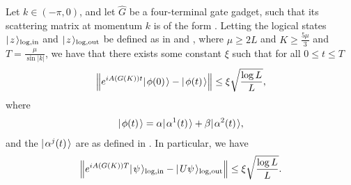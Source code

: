 \documentclass[../thesis-main/thesis-main]{subfiles}
\begin{document}

\begin{lemma}
\label{lem:single_qubit_encoded_computation}
  Let $k\in (-\pi,0)$, and let $\widehat{G}$ be a four-terminal gate gadget, such that its scattering matrix at momentum $k$ is of the form .  Letting the logical states $|\mspace{2mu} z \mspace{2mu} \rangle_{\text{log},\text{in}}$ and $|\mspace{2mu} z \mspace{2mu} \rangle_{\text{log},\text{out}}$ be defined as in  and , where $\mu \geq 2L $ and $K \geq \frac{5 \mu}{3}$ and $T = \frac{\mu}{\sin |k|}$, we have that there exists some constant $\xi$ such that for all $0 \leq t \leq T$
\begin{align}
  \Big\Vert e^{i A(G(K))t} |\mspace{2mu} \phi(0) \mspace{2mu} \rangle - |\mspace{2mu} \phi(t) \mspace{2mu} \rangle \Big\Vert \leq \xi \sqrt{\frac{\log L}{L}},
\end{align}
where
\begin{align}
  |\mspace{2mu} \phi(t) \mspace{2mu} \rangle = \alpha |\mspace{2mu} \alpha^{1}(t) \mspace{2mu} \rangle + \beta |\mspace{2mu} \alpha^2(t) \mspace{2mu} \rangle,
\end{align}
and the $|\mspace{2mu} \alpha^j(t) \mspace{2mu} \rangle$ are as defined in .  In particular, we have
\begin{align}
  \Big\Vert e^{i A(G(K)) T} |\mspace{2mu} \psi \mspace{2mu} \rangle_{\text{log},\text{in}} - |\mspace{2mu} U\psi \mspace{2mu} \rangle_{\text{log},\text{out}} \Big\Vert \leq \xi \sqrt{\frac{\log L}{L}}.
\end{align}
\end{lemma}
\end{document}

